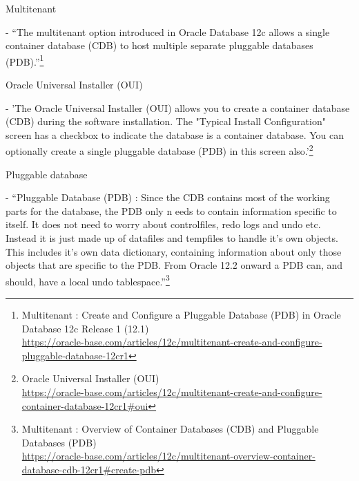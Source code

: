 \begin{itemize*}
\item{\begin{bf}Multitenant\end{bf}} - ``The multitenant option
  introduced in Oracle Database 12c allows a single container
  database (CDB) to host multiple separate pluggable databases
  (PDB).''\footnote{Multitenant : Create and Configure a Pluggable Database (PDB) in Oracle Database 12c Release 1 (12.1)\\
\href{https://oracle-base.com/articles/12c/multitenant-create-and-configure-pluggable-database-12cr1}{https://oracle-base.com/articles/12c/multitenant-create-and-configure-pluggable-database-12cr1}}

\item{\begin{bf}Oracle Universal Installer (OUI)\end{bf}} - 'The Oracle
  Universal Installer (OUI) allows you to create a container database (CDB)
  during the software installation. The "Typical Install Configuration"
  screen has a checkbox to indicate the database is a container database.
  You can optionally create a single pluggable database (PDB) in this
  screen also.'\footnote{Oracle Universal Installer (OUI)\\
    \href{https://oracle-base.com/articles/12c/multitenant-create-and-configure-container-database-12cr1\#oui}{https://oracle-base.com/articles/12c/multitenant-create-and-configure-container-database-12cr1\#oui}}

\item{\begin{bf}Pluggable database\end{bf}} - ``Pluggable Database (PDB) : Since 
the CDB contains most of the working parts for the database, the PDB only n
eeds to contain information specific to itself. It does not need to worry about 
controlfiles, redo logs and undo etc. Instead it is just made up of datafiles 
and tempfiles to handle it's own objects. This includes it's own data dictionary, 
containing information about only those objects that are specific to the PDB. 
From Oracle 12.2 onward a PDB can, and should, have a local undo tablespace.''\footnote{Multitenant : Overview of Container Databases (CDB) and Pluggable Databases (PDB)\\
\href{https://oracle-base.com/articles/12c/multitenant-overview-container-database-cdb-12cr1\#create-pdb}{https://oracle-base.com/articles/12c/multitenant-overview-container-database-cdb-12cr1\#create-pdb}}




\end{itemize*}



